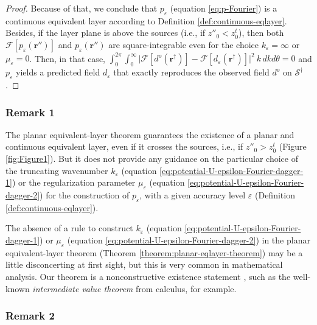 \begin{proof}
	Because of that, we conclude that $p_{\varepsilon}$ (equation \ref{eq:p-Fourier})
	is a continuous equivalent layer according to Definition \ref{def:continuous-eqlayer}. 
	Besides, if the layer plane is above the sources (i.e., if $z''_{0} < z^{t}_{0}$), then both 
	$\mathcal{F} [ p_{\varepsilon}(\mathbf{r}'') ]$ and $p_{\varepsilon}(\mathbf{r}'')$ are square-integrable
	even for the choice $k_{\varepsilon} = \infty$ or $\mu_{\varepsilon} = 0$. Then, in that case, 
	$\int_{0}^{2\pi} \int_{0}^{\infty} 
	\vert \mathcal{F} [ d^{o}(\mathbf{r}^{\dagger}) ] - \mathcal{F} [d_{\varepsilon}(\mathbf{r}^{\dagger}) ] \vert^{2} \: k \, dkd\theta 
	= 0$ and $p_{\varepsilon}$ yields a predicted field $d_{\varepsilon}$ that exactly reproduces the observed field $d^{o}$ 
	on $\mathcal{S}^{\dagger}$.
\end{proof}
	
\subsubsection{Remark 1}

The planar equivalent-layer theorem guarantees the existence of a planar and continuous equivalent layer, even if
it crosses the sources, i.e., if $z''_{0} > z^{t}_{0}$ (Figure \ref{fig:Figure1}).
But it does not provide any guidance on the particular choice of the 
truncating wavenumber $k_{\varepsilon}$ (equation \ref{eq:potential-U-epsilon-Fourier-dagger-1}) or the 
regularization parameter $\mu_{\varepsilon}$ (equation \ref{eq:potential-U-epsilon-Fourier-dagger-2}) 
for the construction of $p_{\varepsilon}$, with a given accuracy level 
$\varepsilon$ (Definition \ref{def:continuous-eqlayer}).

The absence of a rule to construct $k_{\varepsilon}$ (equation \ref{eq:potential-U-epsilon-Fourier-dagger-1}) or 
$\mu_{\varepsilon}$ (equation \ref{eq:potential-U-epsilon-Fourier-dagger-2}) in the 
planar equivalent-layer theorem (Theorem \ref{theorem:planar-eqlayer-theorem}) may be a little disconcerting 
at first sight, but this is very common in mathematical analysis. 
Our theorem is a nonconstructive existence statement \citep[e.g., ][ p. 200]{tao_2016}, such as the well-known
\textit{intermediate value theorem} from calculus, for example.

\subsubsection{Remark 2}

